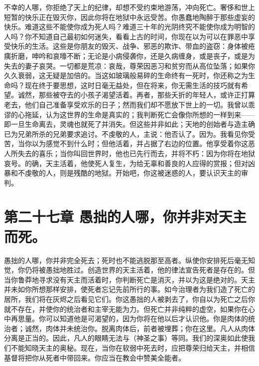 不幸的人哪，你拒绝了天上的纪律，却想不受约束地游荡，冲向死亡。奢侈和世上短暂的快乐正在毁灭你，因此你将在地狱中永远受苦。你愚蠢地陶醉于那些虚妄的快乐。难道这些不能使你成为死人吗？难道三十年的光阴终究不能使你成为明智的人吗？你不知道自己最初如何迷失，看看上古的时间，你现在以为可以在罪恶中享受快乐的生活。这些是你朋友的毁灭、战争、邪恶的欺诈、带血的盗窃：身体被疮痍折磨，呻吟和哀嚎不断；无论是小病侵袭你，还是久病缠身，或是丧子，或是为失去的妻子哀哭。一切都是荒凉：哀哉，尊荣因恶习和贫穷而从高位坠落；如果你久久衰弱，这无疑是加倍的。当这如玻璃般易碎的生命终有一死时，你还称之为生命吗？现在终于要思想，这时日毫无益处，但在将来，你无需生活的技巧就有希望。诚然，那些被夺去的小孩子渴望活着。再者，那些夭折的年轻人，或许正打算老去，他们自己准备享受欢乐的日子；然而我们却不愿放下世上的一切。我曾以乖谬的心拖延，认为这世界的生命是真实的；我判断死亡会像你所想的一样到来——即一旦生命离去，灵魂也就死了并消失。但这些并非如此；天地的创始者与造主确已为兄弟所杀的兄弟要求追讨。不虔敬的人，主说：他否认了。因为。我看见你受苦，当你以为感觉不到什么时；但他活着，并占据了右边的位置。他享受着你这恶人所失去的喜乐；当你叫回世界时，他也已先行而去，并将不朽：因为你将在地狱哀号。的确，天主活着，他使死人复生，为给无辜和善良的人应得的赏报；但对凶暴和不虔敬的人，则是残酷的地狱。开始吧，你这被迷惑的人，要认识天主的审判。\par


\section{第二十七章 愚拙的人哪，你并非对天主而死。}

愚拙的人哪，你并非完全死去；死时也不能逃脱那至高者。纵使你安排死后毫无知觉，你仍将被愚拙地胜过。创造世界的天主活着，他的律法宣告死者是存在的。但当你鲁莽地寻求没有天主而活着时，你判断死亡是消灭，并以为这是绝对的。天主并未如你所想那样安排，使死者忘记先前所行的事。如今治理者为我们造了死亡的居所，我们将在灰烬之后看见它们。你这愚拙的人被剥去了，你自以为死亡之后你就不存在，并使你的统治者和主宰无能为力。但死亡并非纯粹的虚空，如果你在心中再思量。你可以知道他是可渴望的，因为你将在他以后才认识他。你是肉体的统治者；诚然，肉体并未统治你。脱离肉体后，前者被埋葬；你在这里。凡人从肉体分离是正当的。因此，凡人的眼睛无法与（神圣之事）等同。我们的深奥如此使我们不能知晓天主的奥秘。现在，当你在软弱中死去时，应把尊荣归给天主，并相信基督将把你从死者中带回来。你应当在教会中赞美全能者。\par

